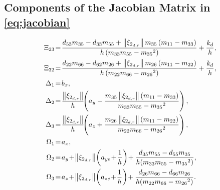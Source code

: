 \subsection{Components of the Jacobian Matrix in \eqref{eq:jacobian}}
\label{app:jacobian}
\begin{subequations}
    \begin{align}
        \Xi_{23}\! &= \!\frac{d_{53}m_{35} - d_{33}m_{55} + \norm{\xi_{2_{d,r}}}m_{35}\left(m_{11}-m_{33}\right)}{h\left(m_{33}m_{55}-{m_{35}}^2\right)} + \frac{k_{d}}{h}, \\
        \Xi_{32}\! &= \!\frac{d_{22}m_{66} - d_{62}m_{26} + \norm{\xi_{2_{d,r}}}m_{26}\left(m_{11}-m_{22}\right)}{h\left(m_{22}m_{66}-{m_{26}}^2\right)} + \frac{k_{d}}{h}, \\
        \Delta_1\! &= \!b_x, \\
        \Delta_2\! &= \!\frac{\norm{\xi_{2_{d,r}}}}{h}\!\!\left(a_y-\frac{m_{35}\norm{\xi_{2_{d,r}}}\left(m_{11}-m_{33}\right)}{m_{33}m_{55}-{m_{35}}^2}\right), \\
        \Delta_3\! &= \!\frac{\norm{\xi_{2_{d,r}}}}{h}\!\!\left(a_z+\frac{m_{26}\norm{\xi_{2_{d,r}}}\left(m_{11}-m_{22}\right)}{m_{22}m_{66}-{m_{26}}^2}\right), \\
        \Omega_1\! &= \!a_x, \\
        \Omega_2\! &= \!a_y \!+\! \norm{\xi_{2_{d,r}}}\!\left(a_{ye} \!+\! \frac{1}{h}\right)\! + \frac{d_{35}m_{55}-d_{55}m_{35}}{h\!\left(m_{33}m_{55}-{m_{35}}^2\right)}, \\
        \Omega_3\! &= \!a_z \!+\! \norm{\xi_{2_{d,r}}}\!\left(a_{ze} \!+\! \frac{1}{h}\right)\! + \frac{d_{26}m_{66}-d_{66}m_{26}}{h\!\left(m_{22}m_{66}-{m_{26}}^2\right)}.
    \end{align}
\end{subequations}
